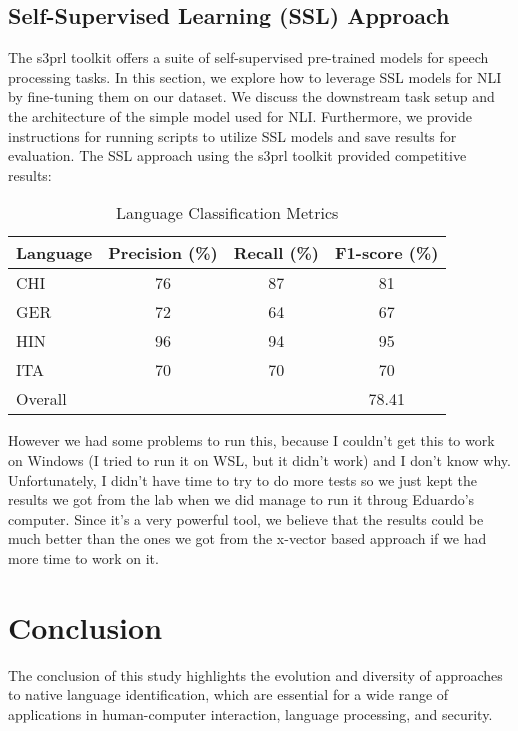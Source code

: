 \documentclass{Interspeech2024}
\begin{document}
\subsection{Self-Supervised Learning (SSL) Approach}
The s3prl toolkit offers a suite of self-supervised pre-trained models for
speech processing tasks. In this section, we explore how to leverage SSL models
for NLI by fine-tuning them on our dataset. We discuss the downstream task
setup and the architecture of the simple model used for NLI. Furthermore, we
provide instructions for running scripts to utilize SSL models and save results
for evaluation. The SSL approach using the s3prl toolkit provided competitive
results:
\begin{table}[htbp]
  \centering
  \caption{Language Classification Metrics}
  \begin{tabular}{lccc}
    \toprule
    Language & Precision (\%) & Recall (\%) & F1-score (\%) \\
    \midrule
    CHI      & 76             & 87          & 81            \\
    GER      & 72             & 64          & 67            \\
    HIN      & 96             & 94          & 95            \\
    ITA      & 70             & 70          & 70            \\
    \midrule
    Overall  &                &             & 78.41         \\
    \bottomrule
  \end{tabular}%
  \label{tab:metrics}%
\end{table}%

However we had some problems to run this, because I couldn't get this to work
on Windows (I tried to run it on WSL, but it didn't work) and I don't know why.
Unfortunately, I didn't have time to try to do more tests so we just kept the
results we got from the lab when we did manage to run it throug Eduardo's
computer. Since it's a very powerful tool, we believe that the results could be
much better than the ones we got from the x-vector based approach if we had more time to 
work on it.

\section{Conclusion}
The conclusion of this study highlights the evolution and diversity of
approaches to native language identification, which are essential for a wide
range of applications in human-computer interaction, language processing, and
security.
\end{document}

